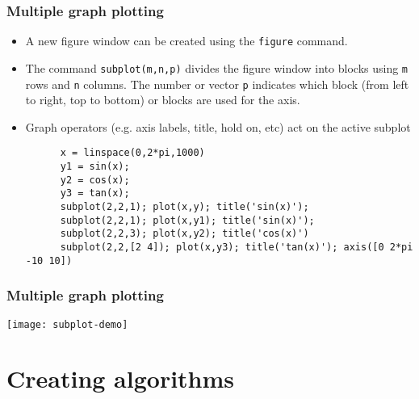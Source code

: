 \begin{frame}[fragile]
  \frametitle{Multiple graph plotting}
  \begin{itemize}
    \item A new figure window can be created using the \lstinline$figure$ command. 
    \item The command \lstinline$subplot(m,n,p)$ divides the figure window into blocks using \lstinline$m$ rows and \lstinline$n$ columns. The number or vector \lstinline$p$ indicates which block (from left to right, top to bottom) or blocks are used for the axis.
    \item Graph operators (e.g. axis labels, title, hold on, etc) act on the active subplot
    \begin{lstlisting}
      x = linspace(0,2*pi,1000)
      y1 = sin(x);
      y2 = cos(x);
      y3 = tan(x);
      subplot(2,2,1); plot(x,y); title('sin(x)');
      subplot(2,2,1); plot(x,y1); title('sin(x)');
      subplot(2,2,3); plot(x,y2); title('cos(x)')
      subplot(2,2,[2 4]); plot(x,y3); title('tan(x)'); axis([0 2*pi -10 10])
    \end{lstlisting}
  \end{itemize}
\end{frame}

\begin{frame}[fragile]
  \frametitle{Multiple graph plotting}
  \begin{center}
    \texttt{[image: subplot-demo]}
  \end{center}

\end{frame}

\section{Creating algorithms}
